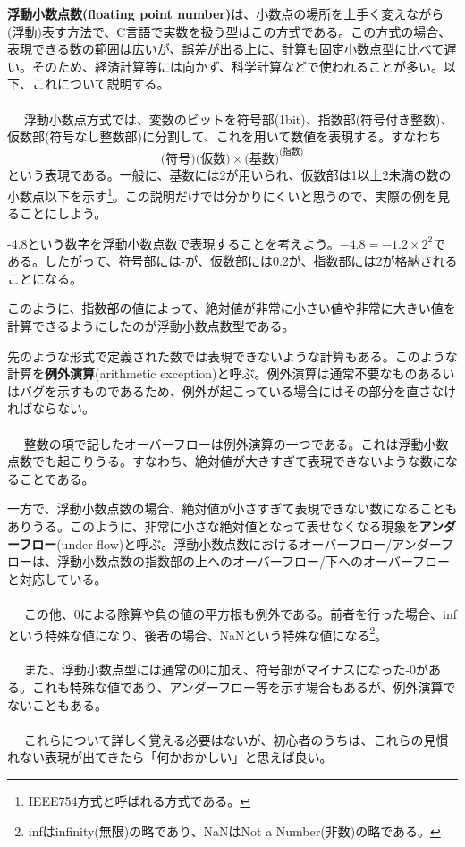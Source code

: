 \textbf{浮動小数点数(floating point number)}は、小数点の場所を上手く変えながら(浮動)表す方法で、C言語で実数を扱う型はこの方式である。この方式の場合、表現できる数の範囲は広いが、誤差が出る上に、計算も固定小数点型に比べて遅い。そのため、経済計算等には向かず、科学計算などで使われることが多い。以下、これについて説明する。
\\ \\　
浮動小数点方式では、変数のビットを符号部(1bit)、指数部(符号付き整数)、仮数部(符号なし整数部)に分割して、これを用いて数値を表現する。すなわち
\[\text{(符号)}\text{(仮数)}\times\text{(基数)}^\text{(指数)}\]
という表現である。一般に、基数には2が用いられ、仮数部は1以上2未満の数の小数点以下を示す\footnote{IEEE754方式と呼ばれる方式である。}。この説明だけでは分かりにくいと思うので、実際の例を見ることにしよう。

-4.8という数字を浮動小数点数で表現することを考えよう。$-4.8=-1.2\times 2^2$である。したがって、符号部には-が、仮数部には0.2が、指数部には2が格納されることになる。

このように、指数部の値によって、絶対値が非常に小さい値や非常に大きい値を計算できるようにしたのが浮動小数点数型である。

先のような形式で定義された数では表現できないような計算もある。このような計算を\textbf{例外演算}(arithmetic exception)と呼ぶ。例外演算は通常不要なものあるいはバグを示すものであるため、例外が起こっている場合にはその部分を直さなければならない。
\\ \\　
整数の項で記したオーバーフローは例外演算の一つである。これは浮動小数点数でも起こりうる。すなわち、絶対値が大きすぎて表現できないような数になることである。

一方で、浮動小数点数の場合、絶対値が小さすぎて表現できない数になることもありうる。このように、非常に小さな絶対値となって表せなくなる現象を\textbf{アンダーフロー}(under flow)と呼ぶ。浮動小数点数におけるオーバーフロー/アンダーフローは、浮動小数点数の指数部の上へのオーバーフロー/下へのオーバーフローと対応している。
\\ \\　
この他、0による除算や負の値の平方根も例外である。前者を行った場合、infという特殊な値になり、後者の場合、NaNという特殊な値になる\footnote{infはinfinity(無限)の略であり、NaNはNot a Number(非数)の略である。}。
\\ \\　
また、浮動小数点型には通常の0に加え、符号部がマイナスになった-0がある。これも特殊な値であり、アンダーフロー等を示す場合もあるが、例外演算でないこともある。
\\ \\　
これらについて詳しく覚える必要はないが、初心者のうちは、これらの見慣れない表現が出てきたら「何かおかしい」と思えば良い。

